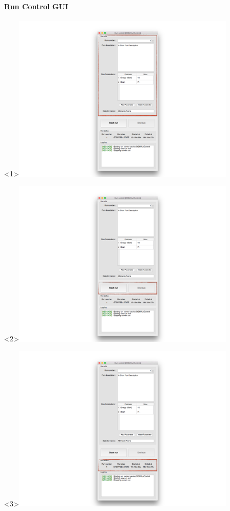 \documentclass[8pt]{beamer}
\begin{document}
      
 \begin{frame}
    \frametitle{\secname}
    \framesubtitle{ Run Control GUI }
    \begin{center}
      \begin{overlayarea}{\textwidth}{\textheight}
        \begin{center}
          \begin{onlyenv}<1>\includegraphics[width=0.8\textwidth]{figs/RunControl/RunControl_Infos.png}\end{onlyenv}
          \begin{onlyenv}<2>\includegraphics[width=0.8\textwidth]{figs/RunControl/RunControl_SOR.png}\end{onlyenv}
          \begin{onlyenv}<3>\includegraphics[width=0.8\textwidth]{figs/RunControl/RunControl_Status.png}\end{onlyenv}

\end{center}
\end{overlayarea}
\end{center}
\end{frame}
\end{document}
